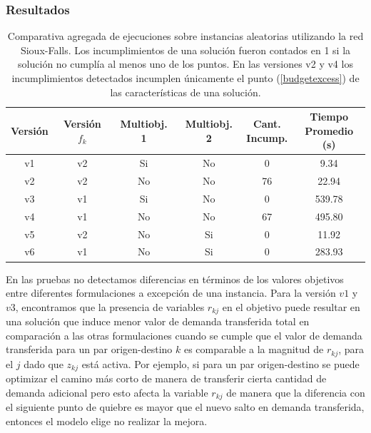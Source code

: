 \documentclass{article}
\begin{document}
  \FloatBarrier
  \subsubsection{Resultados}

  \begin{table}[h!]
    \centering
    \begin{tabular}{cccccc}
      \toprule
      Versión & Versión $f_k$ & Multiobj. 1 & Multiobj. 2 & \shortstack{Cant. \\ Incump.} & \shortstack{Tiempo \\ Promedio (s)} \\
      \midrule
      v1 & v2 & Si & No & 0   & 9.34    \\
      v2 & v2 & No & No & 76  & 22.94   \\
      v3 & v1 & Si & No & 0   & 539.78  \\
      v4 & v1 & No & No & 67  & 495.80  \\
      v5 & v2 & No & Si & 0   & 11.92   \\
      v6 & v1 & No & Si & 0   & 283.93  \\
      \bottomrule
    \end{tabular}
    \caption{Comparativa agregada de ejecuciones sobre instancias aleatorias utilizando la red Sioux-Falls. Los incumplimientos de una solución fueron contados en 1 si la solución no cumplía al menos uno de los puntos. En las versiones v2 y v4 los incumplimientos detectados incumplen únicamente el punto (\ref{budgetexcess}) de las características de una solución.}\label{table:resumenejecuciones}
  \end{table}

  En las pruebas no detectamos diferencias en términos de los valores objetivos entre diferentes formulaciones a excepción de una instancia. Para la versión $v1$ y $v3$, encontramos que la presencia de variables $r_{kj}$ en el objetivo puede resultar en una solución que induce menor valor de demanda transferida total en comparación a las otras formulaciones cuando se cumple que el valor de demanda transferida para un par origen-destino $k$ es comparable a la magnitud de $r_{kj}$, para el $j$ dado que $z_{kj}$ está activa. Por ejemplo, si para un par origen-destino se puede optimizar el camino más corto de manera de transferir cierta cantidad de demanda adicional pero esto afecta la variable $r_{kj}$ de manera que la diferencia con el siguiente punto de quiebre es mayor que el nuevo salto en demanda transferida, entonces el modelo elige no realizar la mejora.
\end{document}
